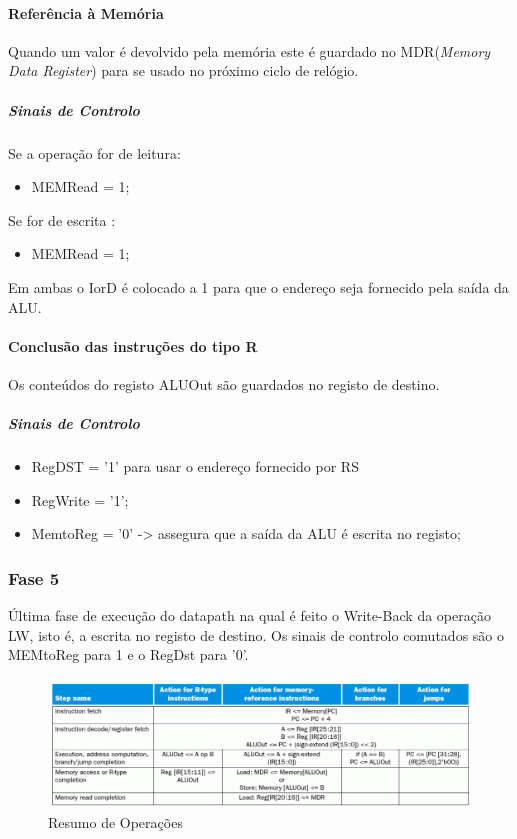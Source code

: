 \documentclass[10pt,a4paper]{book}
\begin{document}
			\paragraph{Referência à Memória}

			Quando um valor é devolvido pela memória este é guardado no MDR(\textit{Memory Data Register}) para se usado no próximo ciclo de relógio.

			\subparagraph{Sinais de Controlo}


			Se a operação for de leitura:
			\begin{itemize}
				\item MEMRead = 1;
			\end{itemize}

			Se for de escrita :

			\begin{itemize}
				\item MEMRead = 1;
			\end{itemize}

			Em ambas o IorD é colocado a 1 para que o endereço seja fornecido pela saída da ALU.


			\paragraph{Conclusão das instruções do tipo R}

			Os conteúdos do registo ALUOut são guardados no registo de destino.

			\subparagraph{Sinais de Controlo}

			\begin{itemize}
			\item RegDST = '1' para usar o endereço fornecido por RS
			\item RegWrite = '1';
			\item MemtoReg = '0' -> assegura que a saída da ALU é escrita no registo;
			\end{itemize}

			\subsubsection{Fase 5}

			Última fase de execução do datapath na qual é feito o Write-Back da operação LW, isto é, a escrita no registo de destino.
			Os sinais de controlo comutados são o MEMtoReg para 1 e o RegDst para '0'.


		\begin{figure}[htp]
	    	\centering
	    	\includegraphics[scale=0.3]{mc2.png}
	    	\caption{Resumo de Operações}
	    	\label{Resumo de Operações}
		\end{figure}
\end{document}
